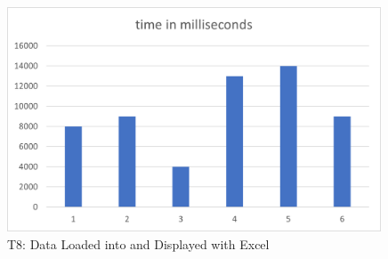 \begin{figure}[htbp]
    \centering
    \includegraphics[width=0.99\textwidth, keepaspectratio]{content/07_evaluation_of_the_solution/ExcelPicture.png}
    \caption{T8: Data Loaded into and Displayed with Excel}    
    \label{fig:Excel}
\end{figure}






